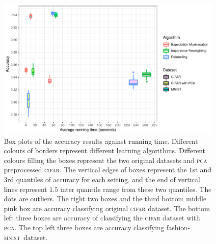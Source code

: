 \documentclass[12pt]{article} %
\newcommand{\mnist}{fashion-\textsc{mnist}}
\begin{document}
\begin{figure}
	\centering
    \includegraphics[scale=0.7]{boxplotv}%
	\caption{Box plots of the accuracy results against running time. Different colours of borders represent different learning algorithms. Different colours filling the boxes represent the two original datasets and \textsc{pca} preprocessed \textsc{cifar}. The vertical edges of boxes represent the $1$st and $3$rd quantiles of accuracy for each setting, and the end of vertical lines represent $1.5$ inter quantile range from these two quantiles. The dots are outliers. 
The right two boxes and the third bottom middle pink box are accuracy classifying original \textsc{cifar} dataset. The bottom left three boxes are accuracy of classifying the \textsc{cifar} dataset with \textsc{pca}. The top left three boxes are accuracy classifying \mnist\ dataset.}
	\label{fig:Boxplot}
\end{figure}
\end{document}
